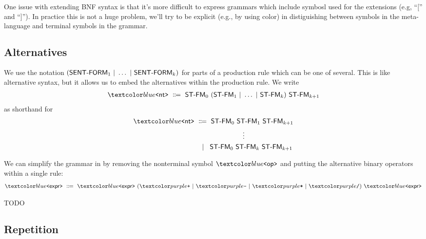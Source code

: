 \begin{remark}
  One issue with extending BNF syntax is that it's more difficult to express grammars which include symbosl used for the extensions (e.g, \enquote{$[$} and \enquote{$]$}).
  In practice this is not a huge problem, we'll try to be explicit (e.g., by using color) in distiguishing between symbols in the meta-language and terminal symbols in the grammar.
\end{remark}

\subsection*{Alternatives}

\begin{definition}
  We use the notation $(\textsf{SENT-FORM}_1 \ | \  \dots \ | \  \textsf{SENT-FORM}_k)$ for parts of a production rule which can be one of several.
  This is like alternative syntax, but it allows us to embed the alternatives within the production rule.
  We write
  \begin{align*}
    \bnfnt{nt} \bnfeq \textsf{ST-FM}_0 \ (\textsf{ST-FM}_1 \bnfalt \dots \bnfalt \textsf{ST-FM}_k) \ \textsf{ST-FM}_{k + 1}
  \end{align*}
  as shorthand for
  \begin{align*}
    \bnfnt{nt} &\bnfeq \textsf{ST-FM}_0 \ \textsf{ST-FM}_1 \ \textsf{ST-FM}_{k + 1} \\
    &\hspace{25mm} \vdots \\
    &\bnfaltn \textsf{ST-FM}_0 \ \textsf{ST-FM}_k \ \textsf{ST-FM}_{k + 1}
  \end{align*}
\end{definition}

\begin{example}
  We can simplify the grammar in  by removing the nonterminal symbol $\bnfnt{op}$ and putting the alternative binary operators within a single rule:
  \begin{align*}
    \bnfnt{expr} \bnfeq \bnfnt{expr} \ (\bnft{+} \bnfalt \bnft{-} \bnfalt \bnft{*} \bnfalt \bnft{/}) \ \bnfnt{expr}
  \end{align*}
\end{example}

\begin{exercise}
  TODO
\end{exercise}

\subsection*{Repetition}

